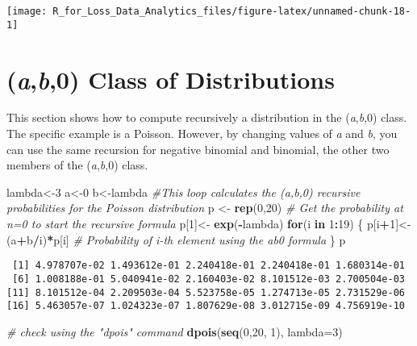 \documentclass[]{book}
\newenvironment{Shaded}{\begin{snugshade}}{\end{snugshade}}
\newcommand{\KeywordTok}[1]{\textcolor[rgb]{0.13,0.29,0.53}{\textbf{#1}}}
\newcommand{\DataTypeTok}[1]{\textcolor[rgb]{0.13,0.29,0.53}{#1}}
\newcommand{\DecValTok}[1]{\textcolor[rgb]{0.00,0.00,0.81}{#1}}
\newcommand{\StringTok}[1]{\textcolor[rgb]{0.31,0.60,0.02}{#1}}
\newcommand{\CommentTok}[1]{\textcolor[rgb]{0.56,0.35,0.01}{\textit{#1}}}
\newcommand{\ControlFlowTok}[1]{\textcolor[rgb]{0.13,0.29,0.53}{\textbf{#1}}}
\newcommand{\OperatorTok}[1]{\textcolor[rgb]{0.81,0.36,0.00}{\textbf{#1}}}
\newcommand{\NormalTok}[1]{#1}
\theoremstyle{definition}
\theoremstyle{definition}
\theoremstyle{definition}
\theoremstyle{remark}
\begin{document}
\begin{center}\texttt{[image: R\_for\_Loss\_Data\_Analytics\_files/figure-latex/unnamed-chunk-18-1]} \end{center}

\section{\texorpdfstring{(\emph{a},\emph{b},0) Class of
Distributions}{(a,b,0) Class of Distributions}}\label{ab0-class-of-distributions}

This section shows how to compute recursively a distribution in the
(\emph{a},\emph{b},0) class. The specific example is a Poisson. However,
by changing values of \emph{a} and \emph{b}, you can use the same
recursion for negative binomial and binomial, the other two members of
the (\emph{a},\emph{b},0) class.

\begin{Shaded}
\begin{Highlighting}[]
\NormalTok{lambda<-}\DecValTok{3}
\NormalTok{a<-}\DecValTok{0}
\NormalTok{b<-lambda}
\CommentTok{#This loop calculates the (a,b,0) recursive probabilities for the Poisson distribution}
\NormalTok{p <-}\StringTok{ }\KeywordTok{rep}\NormalTok{(}\DecValTok{0}\NormalTok{,}\DecValTok{20}\NormalTok{)}
\CommentTok{# Get the probability at n=0 to start the recursive formula }
\NormalTok{p[}\DecValTok{1}\NormalTok{]<-}\StringTok{ }\KeywordTok{exp}\NormalTok{(}\OperatorTok{-}\NormalTok{lambda)}
\ControlFlowTok{for}\NormalTok{(i }\ControlFlowTok{in} \DecValTok{1}\OperatorTok{:}\DecValTok{19}\NormalTok{)}
\NormalTok{  \{}
\NormalTok{  p[i}\OperatorTok{+}\DecValTok{1}\NormalTok{]<-(a}\OperatorTok{+}\NormalTok{b}\OperatorTok{/}\NormalTok{i)}\OperatorTok{*}\NormalTok{p[i]         }\CommentTok{# Probability of i-th element using the ab0 formula}
\NormalTok{  \}}
\NormalTok{p}
\end{Highlighting}
\end{Shaded}

\begin{verbatim}
 [1] 4.978707e-02 1.493612e-01 2.240418e-01 2.240418e-01 1.680314e-01
 [6] 1.008188e-01 5.040941e-02 2.160403e-02 8.101512e-03 2.700504e-03
[11] 8.101512e-04 2.209503e-04 5.523758e-05 1.274713e-05 2.731529e-06
[16] 5.463057e-07 1.024323e-07 1.807629e-08 3.012715e-09 4.756919e-10
\end{verbatim}

\begin{Shaded}
\begin{Highlighting}[]
\CommentTok{# check using the "dpois" command}
\KeywordTok{dpois}\NormalTok{(}\KeywordTok{seq}\NormalTok{(}\DecValTok{0}\NormalTok{,}\DecValTok{20}\NormalTok{, }\DecValTok{1}\NormalTok{), }\DataTypeTok{lambda=}\DecValTok{3}\NormalTok{)}
\end{Highlighting}
\end{Shaded}
\end{document}
